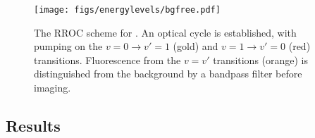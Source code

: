 \begin{figure}
  \centering
  \texttt{[image: figs/energylevels/bgfree.pdf]}
  \caption{
  The RROC scheme for \CaF{}. An optical cycle is established, with pumping on
  the $v=0 \rightarrow v'=1$ (gold) and $v=1 \rightarrow v'=0$ (red) transitions.
  Fluorescence from the $v=v'$ transitions (orange) is distinguished from the
  background by a bandpass filter before imaging.
  }
  \label{exper:fig:bgfreelevels}
\end{figure}

\subsection{Results}

